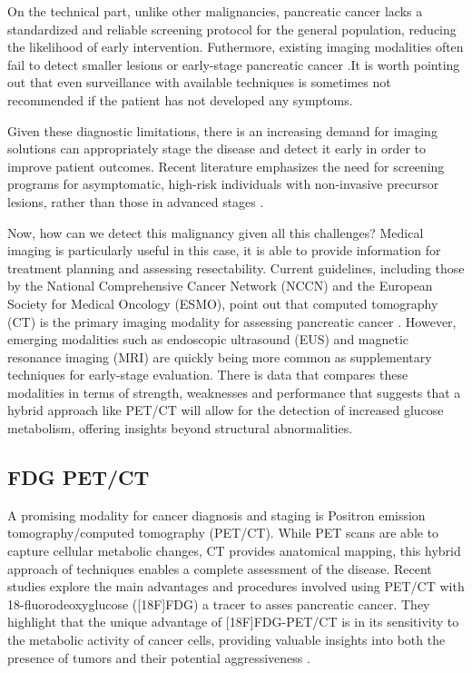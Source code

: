 On the technical part, unlike other malignancies, pancreatic cancer lacks a standardized and reliable screening protocol for the general population, reducing the likelihood of early intervention. Futhermore, existing imaging modalities often fail to detect smaller lesions or early-stage pancreatic cancer \cite{Pubmed30721664}.It is worth pointing out that even surveillance with available techniques is sometimes not recommended if the patient has not developed any symptoms.

Given these diagnostic limitations, there is an increasing demand for imaging solutions can appropriately stage the disease and detect it early in order to improve patient outcomes. Recent literature emphasizes the need for screening programs for asymptomatic, high-risk individuals with non-invasive precursor lesions, rather than those in advanced stages \cite{Cancers2023}.




Now, how can we detect this malignancy given all this challenges? Medical imaging is particularly useful in this case, it is able to provide information for treatment planning and assessing resectability. Current guidelines, including those by the National Comprehensive Cancer Network (NCCN) and the European Society for Medical Oncology (ESMO), point out that computed tomography (CT) is the primary imaging modality for assessing pancreatic cancer \cite{NCCNGuidelines}. However, emerging modalities such as endoscopic ultrasound (EUS) and magnetic resonance imaging (MRI) are quickly being more common as supplementary techniques for early-stage evaluation. There is data that compares these modalities in terms of strength, weaknesses and performance that suggests that a hybrid approach like PET/CT will allow for the detection of increased glucose metabolism, offering insights beyond structural abnormalities. \cite{life13102044}

\subsection{FDG PET/CT}

A promising modality for cancer diagnosis and staging is Positron emission tomography/computed tomography (PET/CT). While PET scans are able to capture cellular metabolic changes, CT provides anatomical mapping, this hybrid approach of techniques enables a complete assessment of the disease. Recent studies explore the main advantages and procedures involved using PET/CT with 18-fluorodeoxyglucose ([18F]FDG) a tracer to asses pancreatic cancer. They highlight that the unique advantage of [18F]FDG-PET/CT is in its sensitivity to the metabolic activity of cancer cells, providing valuable insights into both the presence of tumors and their potential aggressiveness \cite{Pu2021}.

